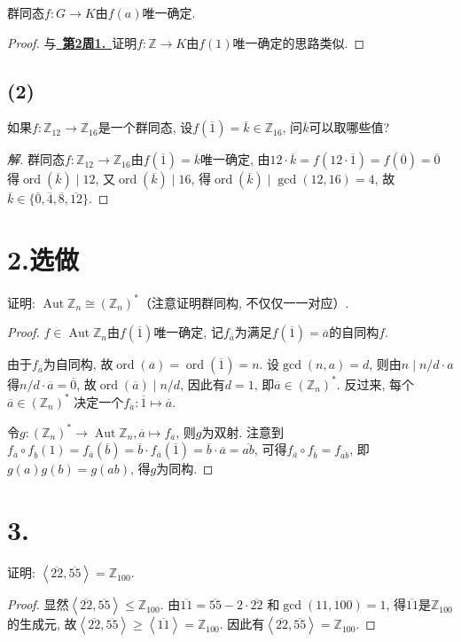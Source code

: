 \documentclass[12pt, a4paper, fontset=windows]{ctexart}
\newcommand{\Z}{\mathbb{Z}}
\newcommand{\Aut}{\operatorname{Aut}}
\newcommand{\cl}[1]{\overline{#1}} %
\newcommand{\gen}[1]{\left\langle{#1}\right\rangle}
\newcommand{\isom}{\cong} %
\newcommand{\kh}[1]{（{#1}）} %
\newcommand{\myref}[2][]{\hyperref[#1]{\color{blue}\ {#2}\ }}
\newcommand{\ord}{\operatorname{ord}}
\newcommand{\xuan}{{\normalsize 选做}}
\newenvironment{solution}{\begin{proof}[解]}{\end{proof}}
\begin{document}
群同态$f:G\to K$由$f(a)$唯一确定. 

\begin{proof}
与\myref[f-with-f(1)]{\bf 第2周1.}证明$f:\Z\to K$由$f(1)$唯一确定的思路类似. 
\end{proof}

\subsection*{(2)}

如果$f:\Z_{12}\to\Z_{16}$是一个群同态, 设$f(\cl{1})=\cl{k}\in\Z_{16}$, 
问$\cl{k}$可以取哪些值? 

\begin{solution}
群同态$f:\Z_{12}\to\Z_{16}$由$f(\cl{1})=\cl{k}$唯一确定, 由$12\cdot\cl{k}=f(12\cdot\cl{1})=f(\cl{0})=\cl{0}$
得$\ord(\cl{k})\mid 12$, 又$\ord(\cl{k})\mid 16$, 得$\ord(\cl{k})\mid\gcd(12,16)=4$, 
故$\cl{k}\in\{\cl{0},\cl{4},\cl{8},\cl{12}\}$. 
\end{solution}

\section*{2.\xuan}

证明: $\Aut\Z_n\isom(\Z_n)^*$\kh{注意证明群同构, 不仅仅一一对应}. 

\begin{proof}
$f\in\Aut\Z_n$由$f(\cl{1})$唯一确定, 记$f_{\cl{a}}$为满足$f(\cl{1})=\cl{a}$的自同构$f$. 

由于$f_{\cl{a}}$为自同构, 故$\ord(\cl{a})=\ord(\cl{1})=n$. 设$\gcd(n,a)=d$, 
则由$n\mid n/d\cdot a$得$n/d\cdot\cl{a}=\cl{0}$, 故$\ord(\cl{a})\mid n/d$, 
因此有$d=1$, 即$\cl{a}\in(\Z_n)^*$. 反过来, 每个$\cl{a}\in(\Z_n)^*$
决定一个$f_{\cl{a}}:\cl{1}\mapsto\cl{a}$. 

令$g:(\Z_n)^*\to\Aut\Z_n,\cl{a}\mapsto f_{\cl{a}}$, 则$g$为双射. 
注意到$f_{\cl{a}}\circ f_{\cl{b}}(1)=f_{\cl{a}}(\cl{b})=\cl{b}\cdot f_{\cl{a}}(\cl{1})=\cl{b}\cdot\cl{a}=\cl{ab}$, 
可得$f_{\cl{a}}\circ f_{\cl{b}}=f_{\cl{ab}}$, 即$g(a)g(b)=g(ab)$, 得$g$为同构. 
\end{proof}

\section*{3.}

证明: $\gen{\cl{22},\cl{55}}=\Z_{100}$. 

\begin{proof}
显然$\gen{\cl{22},\cl{55}}\le\Z_{100}$. 由$\cl{11}=\cl{55}-2\cdot\cl{22}$
和$\gcd(11,100)=1$, 得$\cl{11}$是$\Z_{100}$的生成元, 
故$\gen{\cl{22},\cl{55}}\ge\gen{\cl{11}}=\Z_{100}$. 
因此有$\gen{\cl{22},\cl{55}}=\Z_{100}$. 
\end{proof}
\end{document}
